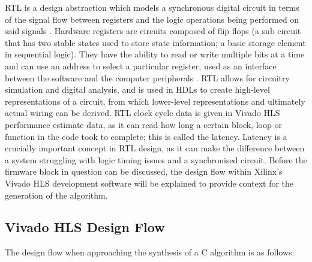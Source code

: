\documentclass[10pt]{article}
\begin{document}
RTL is a design abstraction which models a synchronous digital circuit in terms of the signal flow between registers and the logic operations being performed on said signals \cite{vahid2010digital}. Hardware registers are circuits composed of flip flops (a sub circuit that has two stable states used to store state information; a basic storage element in sequential logic). They have the ability to read or write multiple bits at a time and can use an address to select a particular register, used as an interface between the software and the computer peripherals \cite{bose1996hardware}. RTL allows for circuitry simulation and digital analysis, and is used in HDLs to create high-level representations of a circuit, from which lower-level representations and ultimately actual wiring can be derived. RTL clock cycle data is given in Vivado HLS performance estimate data, as it can read how long a certain block, loop or function in the code took to complete; this is called the latency. Latency is a crucially important concept in RTL design, as it can make the difference between a system struggling with logic timing issues and a synchronised circuit. Before the firmware block in question can be discussed, the design flow within Xilinx's Vivado HLS development software will be explained to provide context for the generation of the algorithm.


\subsection{Vivado HLS Design Flow}
\label{section:HLS_DF}

The design flow when approaching the synthesis of a C algorithm is as follows:
\end{document}
